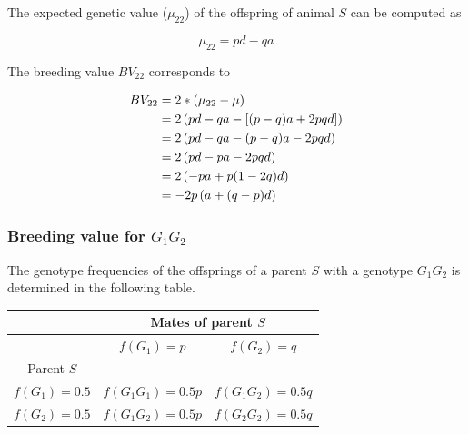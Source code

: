 \documentclass[
]{book}
\theoremstyle{definition}
\theoremstyle{definition}
\theoremstyle{definition}
\theoremstyle{remark}
\begin{document}
\vspace{5ex}

The expected genetic value (\(\mu_{22}\)) of the offspring of animal \(S\) can be computed as

\begin{equation}
\mu_{22} = pd - qa
\label{eq:MeanOffGen22}
\end{equation}

The breeding value \(BV_{22}\) corresponds to

\begin{align}
BV_{22} &=   2*(\mu_{22} - \mu)  \notag \\
        &=   2\left(pd - qa - \left[(p - q)a + 2pqd \right] \right) \notag \\
        &=   2\left(pd - qa - (p - q)a - 2pqd \right) \notag \\
        &=   2\left(pd - pa - 2pqd\right) \notag \\
        &=   2\left(-pa + p(1-2q)d\right) \notag \\
        &=  -2p\left(a + (q - p)d\right)
\label{eq:BVGen22}
\end{align}

\hypertarget{breeding-value-for-g_1g_2}{%
\subsubsection{\texorpdfstring{Breeding value for \(G_1G_2\)}{Breeding value for G\_1G\_2}}\label{breeding-value-for-g_1g_2}}

The genotype frequencies of the offsprings of a parent \(S\) with a genotype \(G_1G_2\) is determined in the following table.

\vspace{5ex}

\begin{center}
\begin{tabular}{|c|c|c|}
\hline
& \multicolumn{2}{|c|}{Mates of parent $S$} \\
\hline
& $f(G_1) = p$       &  $f(G_2) = q$   \\
\hline
Parent $S$       &                    &                 \\
\hline
$f(G_1) = 0.5$ &  $f(G_1G_1) = 0.5p$   &  $f(G_1G_2) = 0.5q$\\
\hline
$f(G_2) = 0.5$ &  $f(G_1G_2) = 0.5p$   &  $f(G_2G_2) = 0.5q$\\
\hline
\end{tabular}
\end{center}
\end{document}
